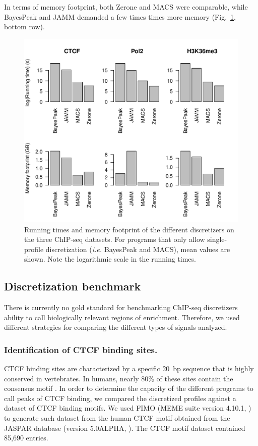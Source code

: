 \documentclass{bioinfo}
\begin{document}
In terms of memory footprint, both Zerone and MACS were comparable, while
BayesPeak and JAMM demanded a few times times more memory (Fig.~\ref{fig:perf},
bottom row).

\begin{figure}[!tpb]
\centerline{\includegraphics[scale=0.5]{performance.pdf}}
\caption{Running times and memory footprint of the different discretizers
on the three ChIP-seq datasets.
For programs that only allow single-profile discretization
(\textit{i.e.} BayesPeak and MACS), mean values are shown.
Note the logarithmic scale in the running times.
}\label{fig:perf}
\end{figure}

\subsection{Discretization benchmark}
There is currently no gold standard for benchmarking ChIP-seq discretizers
ability to call biologically relevant regions of enrichment. Therefore, we used
different strategies for comparing the different types of signals analyzed.

\subsubsection{Identification of CTCF binding sites.}
CTCF binding sites are characterized by a specific 20~bp sequence that is
highly conserved in vertebrates. In humans, nearly 80\% of these sites contain
the consensus motif \citep{pmid17382889}.
In order to determine the capacity of the different programs to call peaks of
CTCF binding, we compared the discretized profiles against a dataset of CTCF
binding motifs. We used FIMO \citep{pmid21330290} (MEME suite version 4.10.1,
\citealp{pmid19458158}) to generate such dataset from the human CTCF motif
obtained from the JASPAR database (version 5.0{\textunderscore}ALPHA,
\citealp{pmid24194598}). The CTCF motif dataset contained 85,690 entries.
\end{document}
